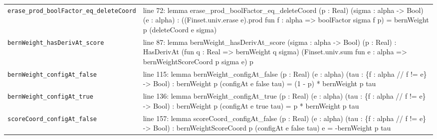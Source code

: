 \documentclass[10pt]{article}
\begin{document}
\begin{longtable}{>{\raggedright\arraybackslash}p{} >{\raggedright\arraybackslash}p{}}
\texttt{erase\_\allowbreak{}prod\_\allowbreak{}boolFactor\_\allowbreak{}eq\_\allowbreak{}deleteCoord} & {\ttfamily\scriptsize line 72:\allowbreak{} lemma erase\_\allowbreak{}prod\_\allowbreak{}boolFactor\_\allowbreak{}eq\_\allowbreak{}deleteCoord (\allowbreak{}p :\allowbreak{} Real)\allowbreak{} (\allowbreak{}sigma :\allowbreak{} alpha -\allowbreak{}> Bool)\allowbreak{} (\allowbreak{}e :\allowbreak{} alpha)\allowbreak{} :\allowbreak{} (\allowbreak{}(\allowbreak{}Finset.\allowbreak{}univ.\allowbreak{}erase e)\allowbreak{}.\allowbreak{}prod fun f :\allowbreak{} alpha =\allowbreak{}> boolFactor sigma f p)\allowbreak{} =\allowbreak{} bernWeight p (\allowbreak{}deleteCoord e sigma)\allowbreak{}} \\[0.45em]
\texttt{bernWeight\_\allowbreak{}hasDerivAt\_\allowbreak{}score} & {\ttfamily\scriptsize line 87:\allowbreak{} lemma bernWeight\_\allowbreak{}hasDerivAt\_\allowbreak{}score (\allowbreak{}sigma :\allowbreak{} alpha -\allowbreak{}> Bool)\allowbreak{} (\allowbreak{}p :\allowbreak{} Real)\allowbreak{} :\allowbreak{} HasDerivAt (\allowbreak{}fun q :\allowbreak{} Real =\allowbreak{}> bernWeight q sigma)\allowbreak{} (\allowbreak{}Finset.\allowbreak{}univ.\allowbreak{}sum fun e :\allowbreak{} alpha =\allowbreak{}> bernWeightScoreCoord p sigma e)\allowbreak{} p} \\[0.45em]
\texttt{bernWeight\_\allowbreak{}configAt\_\allowbreak{}false} & {\ttfamily\scriptsize line 115:\allowbreak{} lemma bernWeight\_\allowbreak{}configAt\_\allowbreak{}false (\allowbreak{}p :\allowbreak{} Real)\allowbreak{} (\allowbreak{}e :\allowbreak{} alpha)\allowbreak{} (\allowbreak{}tau :\allowbreak{} \{f :\allowbreak{} alpha /\allowbreak{}/\allowbreak{} f !=\allowbreak{} e\} -\allowbreak{}> Bool)\allowbreak{} :\allowbreak{} bernWeight p (\allowbreak{}configAt e false tau)\allowbreak{} =\allowbreak{} (\allowbreak{}1 -\allowbreak{} p)\allowbreak{} *\allowbreak{} bernWeight p tau} \\[0.45em]
\texttt{bernWeight\_\allowbreak{}configAt\_\allowbreak{}true} & {\ttfamily\scriptsize line 136:\allowbreak{} lemma bernWeight\_\allowbreak{}configAt\_\allowbreak{}true (\allowbreak{}p :\allowbreak{} Real)\allowbreak{} (\allowbreak{}e :\allowbreak{} alpha)\allowbreak{} (\allowbreak{}tau :\allowbreak{} \{f :\allowbreak{} alpha /\allowbreak{}/\allowbreak{} f !=\allowbreak{} e\} -\allowbreak{}> Bool)\allowbreak{} :\allowbreak{} bernWeight p (\allowbreak{}configAt e true tau)\allowbreak{} =\allowbreak{} p *\allowbreak{} bernWeight p tau} \\[0.45em]
\texttt{scoreCoord\_\allowbreak{}configAt\_\allowbreak{}false} & {\ttfamily\scriptsize line 157:\allowbreak{} lemma scoreCoord\_\allowbreak{}configAt\_\allowbreak{}false (\allowbreak{}p :\allowbreak{} Real)\allowbreak{} (\allowbreak{}e :\allowbreak{} alpha)\allowbreak{} (\allowbreak{}tau :\allowbreak{} \{f :\allowbreak{} alpha /\allowbreak{}/\allowbreak{} f !=\allowbreak{} e\} -\allowbreak{}> Bool)\allowbreak{} :\allowbreak{} bernWeightScoreCoord p (\allowbreak{}configAt e false tau)\allowbreak{} e =\allowbreak{} -\allowbreak{}bernWeight p tau} \\[0.45em]

\end{longtable}
\end{document}
